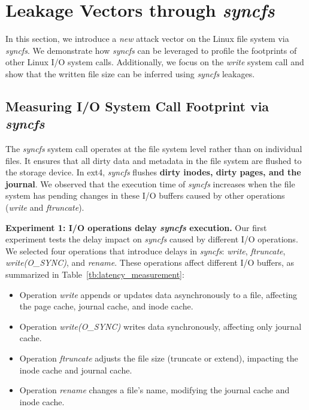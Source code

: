 \section{Leakage Vectors through \textit{syncfs}}
\label{sec:reverse_engineering}

In this section, we introduce a \textit{new} attack vector on the Linux file system via \textit{syncfs}. We demonstrate how \textit{syncfs} can be leveraged to profile the footprints of other Linux I/O system calls. Additionally, we focus on the \textit{write} system call and show that the written file size can be inferred using \textit{syncfs} leakages. 




\subsection{Measuring I/O System Call Footprint via \textit{syncfs}}

The \textit{syncfs} system call operates at the file system level rather than on individual files. It ensures that all dirty data and metadata in the file system are flushed to the storage device. In ext4, \textit{syncfs} flushes \textbf{dirty inodes, dirty pages, and the journal}. We observed that the execution time of \textit{syncfs} increases when the file system has pending changes in these I/O buffers caused by other operations (\eg \textit{write} and \textit{ftruncate}). 

\textbf{Experiment 1: I/O operations delay \textit{syncfs} execution.} Our first experiment tests the delay impact on \textit{syncfs} caused by different I/O operations. We selected four operations that introduce delays in \textit{syncfs}: \textit{write}, \textit{ftruncate}, \textit{write(O\_SYNC)}, and \textit{rename}. These operations affect different I/O buffers, as summarized in Table~\ref{tb:latency_measurement}:
\begin{itemize}
    \item Operation \textit{write} appends or updates data asynchronously to a file, affecting the page cache, journal cache, and inode cache.
    \item Operation \textit{write(O\_SYNC)} writes data synchronously, affecting only journal cache.
    \item Operation \textit{ftruncate} adjusts the file size (truncate or extend), impacting the inode cache and journal cache.
    \item Operation \textit{rename} changes a file’s name, modifying the journal cache and inode cache.

\end{itemize}

